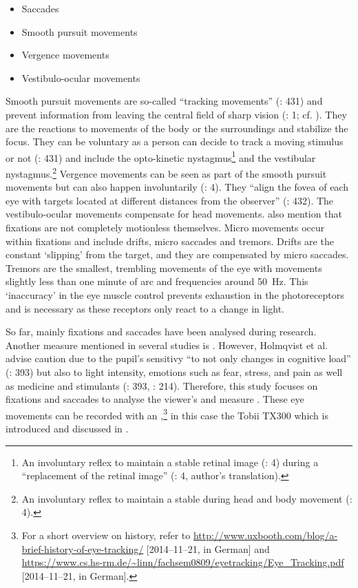\begin{itemize}
\item Saccades
\item Smooth pursuit movements
\item Vergence movements
\item Vestibulo-ocular movements
\end{itemize}

Smooth pursuit movements are so-called “tracking movements” (\citealt{purves2001}: 431) and prevent information from leaving the central field of sharp vision (\citealt{Joos-Roetting-Velich2003}: 1; cf. \citealt{rickheit2003}). They are the reactions to movements of the body or the surroundings and stabilize the focus. They can be voluntary as a person can decide to track a moving stimulus or not (\citealt{purves2001}: 431) and include the opto-kinetic nystagmus\footnote{An involuntary reflex to maintain a stable retinal image (\citealt{Joos-Roetting-Velich2003}: 4) during a “replacement of the retinal image” (\citealt{Joos-Roetting-Velich2003}: 4, author’s translation).} and the vestibular nystagmus.\footnote{An involuntary reflex to maintain a stable  during head and body movement (\citealt{Joos-Roetting-Velich2003}: 4).} Vergence movements can be seen as part of the smooth pursuit movements but can also happen involuntarily (\citealt{Joos-Roetting-Velich2003}: 4). They “align the fovea of each eye with targets located at different distances from the observer” (\citealt{purves2001}: 432). The vestibulo-ocular movements compensate for head movements. \citet{Joos-Roetting-Velich2003} also mention that fixations are not completely motionless themselves. Micro movements occur within fixations and include drifts, micro saccades and tremors. Drifts are the constant ‘slipping’ from the  target, and they are compensated by micro saccades. Tremors are the smallest, trembling movements of the eye with movements slightly less than one minute of arc and frequencies around 50~Hz. This ‘inaccuracy’ in the eye muscle control prevents exhaustion in the photoreceptors and is necessary as these receptors only react to a change in light.

So far, mainly fixations and saccades have been analysed during research. Another measure mentioned in several studies is . However, Holmqvist et al. advise caution due to the pupil’s sensitivy “to not only changes in cognitive load” (\citeyear{Holmqvist2011}: 393) but also to light intensity, emotions such as fear, stress, and pain as well as medicine and stimulants (\citeyear{Holmqvist2011}: 393, \citealt{Hvelplund2014}: 214). Therefore, this study focuses on fixations and saccades to analyse the viewer’s  and measure . These eye movements can be recorded with an ,\footnote{For a short overview on  history, refer to \url{http://www.uxbooth.com/blog/a-brief-history-of-eye-tracking/} [2014--11--21, in German] and \url{https://www.cs.hs-rm.de/~linn/fachsem0809/eyetracking/Eye_Tracking.pdf} [2014--11--21, in German].} in this case the Tobii TX300 which is introduced and discussed in .

